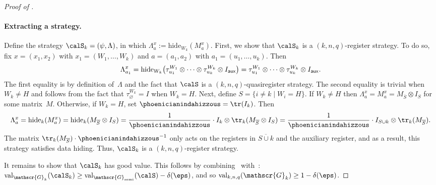 \documentclass[11pt]{article}
\newcommand{\hideq}{H}
\newcommand{\game}{\mathscr{G}}
\newcommand{\valstrat}[2]{\mathrm{val}_{#1}(#2)}
\newcommand{\valreg}[2]{\mathrm{val}_{#1}(#2)}
\newcommand{\reg}[1]{{\mathsf{#1}}}
\newcommand{\hide}[2]{\mathrm{hide}_{#1}(#2)}
\begin{document}
\begin{proof}[Proof of ]
\paragraph{Extracting a strategy.}
Define the strategy $\calS_k = (\psi, \Lambda)$, in which
$\Lambda_a^x := \hide{W_k}{M^x_a}$.
First, we show that $\calS_k$ is a $(k, n, q)$-register strategy.
To do so, fix $x= (x_1, x_2)$ with $x_1 = (W_1, \ldots, W_k)$ and $a = (a_1, a_2)$ with $a_1 = (u_1, \ldots, u_k)$.
Then
\begin{equation*}
\Lambda_{a_1}^x
= \mathrm{hide}_{W_k}\big(\tau^{W_1}_{u_1} \otimes \cdots \otimes \tau^{W_k}_{u_k} \otimes I_{\reg{aux}}\big)\\
	= \tau^{W_1}_{u_1} \otimes \cdots \otimes \tau^{W_k}_{u_k} \otimes I_{\reg{aux}}.
\end{equation*}
The first equality is by definition of~$\Lambda$ and the fact that $\calS$ is a $(k, n, q)$-quasiregister strategy.
The second equality is trivial when $W_k \neq \hideq$ and follows from the fact that $\tau^{W_k}_{\varnothing} = I$ when $W_k = \hideq$.
Next, define $S = \{i\neq k  \mid W_i = \hideq\}$.
If $W_k \neq \hideq$ then $\Lambda_a^x = M^x_a = M_{\overline{S}} \otimes I_S$ for some matrix~$M$.
Otherwise, if $W_k = \hideq$, set $\phoenicianindahizzous = \tr(I_k)$. Then
\begin{equation*}
\Lambda_a^x = \hide{k}{M^x_a} = \hide{k}{M_{\overline{S}} \otimes I_S}
= \frac{1}{\phoenicianindahizzous} \cdot I_k \otimes \tr_k(M_{\overline{S}} \otimes I_S)
= \frac{1}{\phoenicianindahizzous} \cdot I_{S \cup k} \otimes \tr_k(M_{\overline{S}}).
\end{equation*}
The matrix $\tr_k(M_{\overline{S}}) \cdot \phoenicianindahizzous^{-1}$
only acts on the registers in $\overline{S \cup k}$ and the auxiliary register,
and as a result, this strategy satisfies data hiding.
Thus, $\calS_k$ is a $(k, n, q)$-register strategy.

It remains to show that $\calS_k$ has good value.
This follows by combining~ with~:
$\valstrat{\game_{k}}{\calS_{k}} \geq \valstrat{\game_{\mathrm{semi}}}{\calS} - \delta(\eps)$,
and so $\valreg{k,n,q}{\game_{k}} \geq 1 - \delta(\eps)$.
\end{proof}


\end{document}

